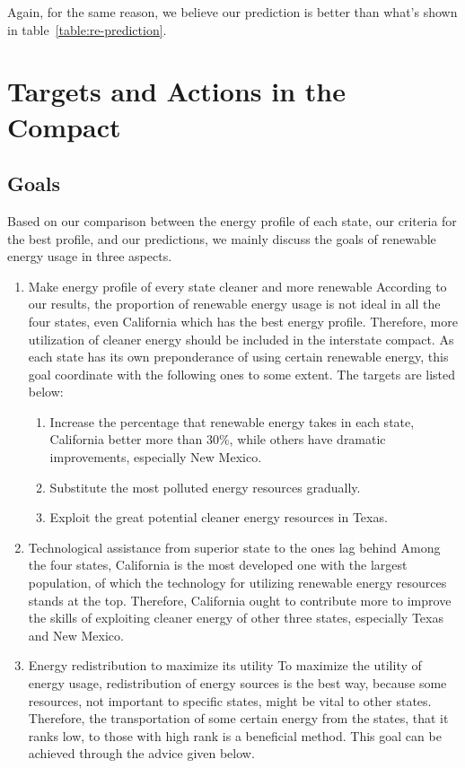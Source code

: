 \documentclass{mcmthesis}
\begin{document}
Again, for the same reason, we believe our prediction is better than what's shown in table~\ref{table:re-prediction}.

\section{Targets and Actions in the Compact}

\subsection{Goals}
Based on our comparison between the energy profile of each state, our criteria for the best profile, and our predictions, we mainly discuss the goals of renewable energy usage in three aspects.

\begin{enumerate}
\item Make energy profile of every state cleaner and more renewable
According to our results, the proportion of renewable energy usage is not ideal in all the four states, even California which has the best energy profile. Therefore, more utilization of cleaner energy should be included in the interstate compact. As each state has its own preponderance of using certain renewable energy, this goal coordinate with the following ones to some extent. The targets are listed below:
\begin{enumerate}
\item Increase the percentage that renewable energy takes in each state, California better more than 30\%, while others have dramatic improvements, especially New Mexico.
\item Substitute the most polluted energy resources gradually.
\item Exploit the great potential cleaner energy resources in Texas.
\end{enumerate}
\item Technological assistance from superior state to the ones lag behind
Among the four states, California is the most developed one with the largest population, of which the technology for utilizing renewable energy resources stands at the top. Therefore, California ought to contribute more to improve the skills of exploiting cleaner energy of other three states, especially Texas and New Mexico.
\item Energy redistribution to maximize its utility
To maximize the utility of energy usage, redistribution of energy sources is the best way, because some resources, not important to specific states, might be vital to other states. Therefore, the transportation of some certain energy from the states, that it ranks low, to those with high rank is a beneficial method. This goal can be achieved through the advice given below.
\end{enumerate}
\end{document}
